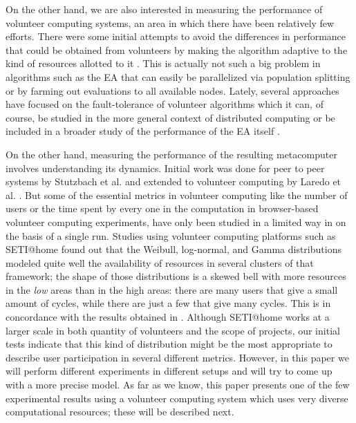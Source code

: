 \documentclass{sig-alternate}
\begin{document}
On the other hand, we are also interested in measuring the performance
of volunteer computing systems, an area in which there have been
relatively few efforts. There were some initial attempts to avoid the differences in performance
that could be obtained from volunteers  by making
the algorithm adaptive to the kind of resources allotted to it
\cite{milani2004online}. This is actually not such a big problem in
algorithms such as the EA that can easily be
parallelized via population splitting or by farming out evaluations to all
available nodes. Lately, several approaches have focused on the
fault-tolerance of volunteer algorithms
\cite{gonzalez2010characterizing} which it can, of course, be studied in
the more general context of distributed computing 
\cite{nogueras2015studying} or be included in a broader study of the
performance of the EA itself
\cite{DBLP:journals/gpem/LaredoBGVAGF14}.

On the other hand, measuring the performance of the resulting metacomputer
involves understanding its dynamics. Initial
work was done for peer to peer systems by Stutzbach et
al. \cite{stutzbach2006understanding} and extended to volunteer
computing by Laredo et al. \cite{churn08,laredo2008rcp}. 
But some of the essential metrics in volunteer computing like the
number of users or the time spent by every one in the
computation in browser-based volunteer computing experiments, have
only been studied in a limited way in 
\cite{DBLP:journals/gpem/LaredoBGVAGF14} on the basis of a single
run. Studies using volunteer computing platforms such as SETI@home
\cite{javadi2009mining} found out that the Weibull, log-normal, and
Gamma distributions 
modeled quite well the availability of resources in several clusters
of that framework; the shape of those distributions is a skewed bell
with more resources in the {\em low} areas than in the high areas:
there are many users that give a small amount of cycles, while there
are just a few that give many cycles. This is in concordance with the
results obtained in \cite{agajaj}. Although SETI@home works
at a larger scale in both quantity of volunteers and the scope of projects, 
our initial tests indicate that
this kind of distribution might be the most appropriate to describe
user participation in several different metrics. However, in this
paper we will perform different experiments in different setups and
will try to come up with a more precise model. 
As far as we know, this paper presents one of the few experimental
results using a volunteer computing system which uses  %
very diverse computational resources; these will be described next.
\end{document}
